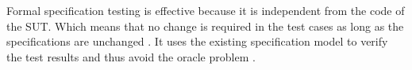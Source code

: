{Formal specification testing is effective because it is independent from the code of the SUT. Which means that no change is required in the test cases as long as the specifications are unchanged \cite{gaudel2010software}. It uses the existing specification model to verify the test results and thus avoid the oracle problem .










}
